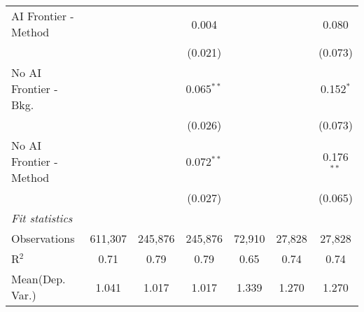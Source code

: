 \begin{tabular}{lcccccc}
   AI Frontier - Method    &               &               & 0.004         &               &               & 0.080\\   
                           &               &               & (0.021)       &               &               & (0.073)\\   
   No AI Frontier - Bkg.   &               &               & 0.065$^{**}$  &               &               & 0.152$^{*}$\\   
                           &               &               & (0.026)       &               &               & (0.073)\\   
   No AI Frontier - Method &               &               & 0.072$^{**}$  &               &               & 0.176$^{**}$\\   
                           &               &               & (0.027)       &               &               & (0.065)\\   
   \midrule
   \emph{Fit statistics}\\
   Observations            & 611,307       & 245,876       & 245,876       & 72,910        & 27,828        & 27,828\\  
   R$^2$                   & 0.71          & 0.79          & 0.79          & 0.65          & 0.74          & 0.74\\  
Mean(Dep. Var.) & 1.041 & 1.017 & 1.017 & 1.339 & 1.270 & 1.270 \\
   

\end{tabular}
